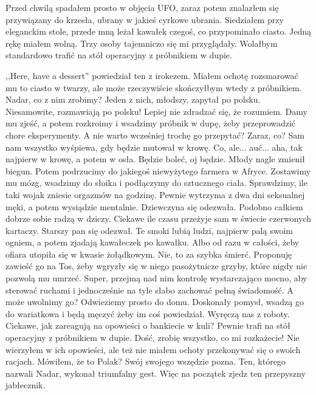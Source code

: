 Przed chwilą spadałem prosto w objęcia UFO, zaraz potem znalazłem się przywiązany do krzesła, ubrany w jakieś cyrkowe ubrania.
Siedziałem przy eleganckim stole, przede mną leżał kawałek czegoś, co przypominało ciasto. Jedną rękę miałem wolną.
Trzy osoby tajemniczo się mi przyglądały. Wolałbym standardowo trafić na stół operacyjny z próbnikiem w dupie.
\begin{dialogue}
\ds{} ,,Here, have a dessert'' \dm{} powiedział ten z irokezem. Miałem ochotę rozsmarować mu to ciasto w twarzy, ale może rzeczywiście skończyłbym wtedy z próbnikiem.
\ds{} Nadar, co z nim zrobimy? \dm{} Jeden z nich, młodszy, zapytał po polsku. Niesamowite, rozmawiają po polsku! Lepiej nie zdradzać się, że rozumiem.
\ds{} Damy mu zjeść, a potem rozkroimy i wsadzimy próbnik w dupę, żeby przeprowadzić chore eksperymenty.
\ds{} A nie warto wcześniej trochę go przepytać? Zaraz, co?
\ds{} Sam nam wszystko wyśpiewa, gdy będzie mutował w krowę.
\ds{} Co, ale... auć... aha, tak najpierw w krowę, a potem w osła. Będzie boleć, oj będzie. \dm{} Młody nagle zmienił biegun.
\ds{} Potem podrzucimy do jakiegoś niewyżytego farmera w Afryce.
\ds{} Zostawimy mu mózg, wsadzimy do słoika i podłączymy do sztucznego ciała.
\ds{} Sprawdzimy, ile taki wojak zniesie orgazmów na godzinę. Pewnie wytrzyma z dwa dni seksualnej męki, a potem wysiądzie mentalnie. \dm{} Dziewczyna się odezwała.
\ds{} Podobno całkiem dobrze sobie radzą w dziczy. Ciekawe ile czasu przeżyje sam w świecie czerwonych kartaczy. \dm{} Starszy pan się odezwał.
\ds{} Te smoki lubią ludzi, najpierw palą swoim ogniem, a potem zjadają kawałeczek po kawałku.
\ds{} Albo od razu w całości, żeby ofiara utopiła się w kwasie żołądkowym.
\ds{} Nie, to za szybka śmierć. Proponuję zawieść go na Tos, żeby wgryzły się w niego pasożytnicze grzyby, które nigdy nie pozwolą mu umrzeć.
\ds{} Super, przejmą nad nim kontrolę wystarczająco mocno, aby sterować ruchami i jednocześnie na tyle słabo zachować pełną świadomość.
\ds{} A może uwolnimy go? Odwieziemy prosto do domu.
\ds{} Doskonały pomysł, wsadzą go do wariatkowa i będą męczyć żeby im coś powiedział. Wyręczą nas z roboty. Ciekawe, jak zareagują na opowieści o bankiecie w kuli?
\ds{} Pewnie trafi na stół operacyjny z próbnikiem w dupie.
\ds{} Dość, zrobię wszystko, co mi rozkażecie! \dm{} Nie wierzyłem w ich opowieści, ale też nie miałem ochoty przekonywać się o swoich racjach.
\ds{} Mówiłem, że to Polak? Swój swojego wszędzie pozna. \dm{} Ten, którego nazwali Nadar, wykonał triumfalny gest. \dm{} Więc na początek zjedz ten przepyszny jabłecznik.
\end{dialogue}

